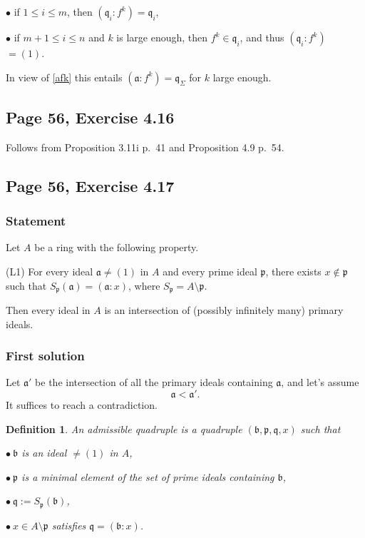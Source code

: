 \documentclass[parskip=half,fontsize=12pt]{scrartcl}%
\newcommand{\mf}{\mathfrak}
\newcommand{\aaa}{\mf a}
\newcommand{\bbb}{\mf b}
\newcommand{\ppp}{\mf p}
\newcommand{\qqq}{\mf q}
\newcommand{\bu}{\bullet}
\newtheorem{df}[thm]{Definition}
\begin{document}
$\bu$ if $1\le i\le m$, then $(\qqq_i:f^k)=\qqq_i$,  

$\bu$ if $m+1\le i\le n$ and $k$ is large enough, then $f^k\in\qqq_i$, and thus $(\qqq_i:f^k)$ $=(1)$.

In view of \eqref{afk} this entails $(\aaa:f^k)=\qqq_\Sigma$ for $k$ large enough.

\subsection{Page 56, Exercise 4.16}%

Follows from Proposition 3.11i p.~41 and Proposition 4.9 p.~54.

\subsection{Page 56, Exercise 4.17}%

\subsubsection{Statement}\label{417}%

Let $A$ be a ring with the following property.

(L1) For every ideal $\mathfrak a\ne(1)$ in $A$ and every prime ideal $\mathfrak p$, there exists $x\notin\mathfrak p$ such that $S_{\mathfrak p}(\mathfrak a)=(\mathfrak a:x)$, where $S_{\mathfrak p}=A\setminus\mathfrak p$.

Then every ideal in $A$ is an intersection of (possibly infinitely many) primary ideals.

\subsubsection{First solution}%

Let $\aaa'$ be the intersection of all the primary ideals containing $\aaa$, and let's assume  
\begin{equation}\label{abs417}
\aaa<\aaa'.
\end{equation} 
It suffices to reach a contradiction.

\begin{df} 
An \emph{admissible quadruple} is a quadruple $(\bbb,\ppp,\qqq,x)$ such that 

$\bu\ \bbb$ is an ideal $\ne(1)$ in $A$, 

$\bu\ \mathfrak p$ is a minimal element of the set of prime ideals containing $\bbb$, 

$\bu\ \mathfrak q:=S_{\mathfrak p}(\bbb)$, 

$\bu\ x\in A\setminus\ppp$ satisfies $\mathfrak q=(\bbb:x)$. 
\end{df}
\end{document}
